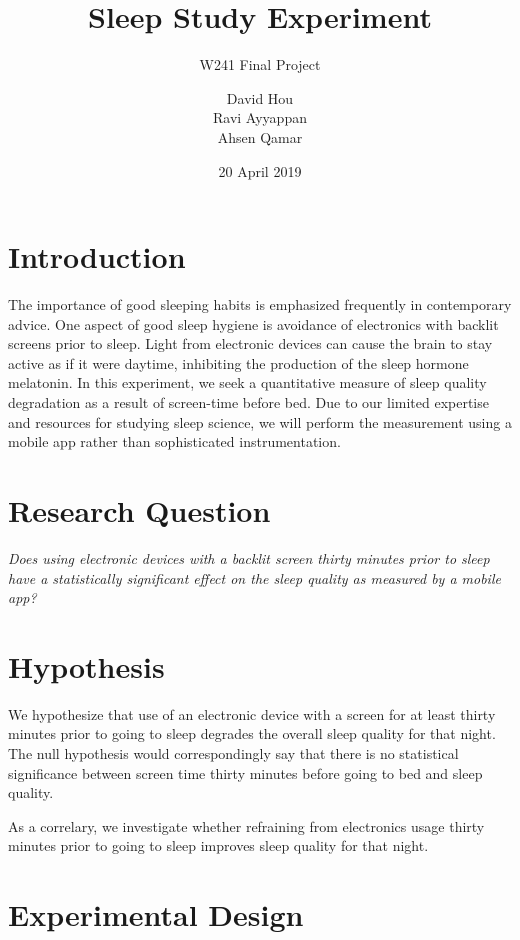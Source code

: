 \documentclass[12pt,]{article}
\title{Sleep Study Experiment}
\subtitle{W241 Final Project}
\author{David Hou \\ Ravi Ayyappan \\ Ahsen Qamar}
\date{20 April 2019}
\begin{document}
\maketitle

\hypertarget{introduction}{%
\section{Introduction}\label{introduction}}

The importance of good sleeping habits is emphasized frequently in
contemporary advice. One aspect of good sleep hygiene is avoidance of
electronics with backlit screens prior to sleep. Light from electronic
devices can cause the brain to stay active as if it were daytime,
inhibiting the production of the sleep hormone melatonin. In this
experiment, we seek a quantitative measure of sleep quality degradation
as a result of screen-time before bed. Due to our limited expertise and
resources for studying sleep science, we will perform the measurement
using a mobile app rather than sophisticated instrumentation.

\hypertarget{research-question}{%
\section{Research Question}\label{research-question}}

\emph{Does using electronic devices with a backlit screen thirty minutes
prior to sleep have a statistically significant effect on the sleep
quality as measured by a mobile app?}

\hypertarget{hypothesis}{%
\section{Hypothesis}\label{hypothesis}}

We hypothesize that use of an electronic device with a screen for at
least thirty minutes prior to going to sleep degrades the overall sleep
quality for that night. The null hypothesis would correspondingly say
that there is no statistical significance between screen time thirty
minutes before going to bed and sleep quality.

As a correlary, we investigate whether refraining from electronics usage
thirty minutes prior to going to sleep improves sleep quality for that
night.

\hypertarget{experimental-design}{%
\section{Experimental Design}\label{experimental-design}}
\end{document}
